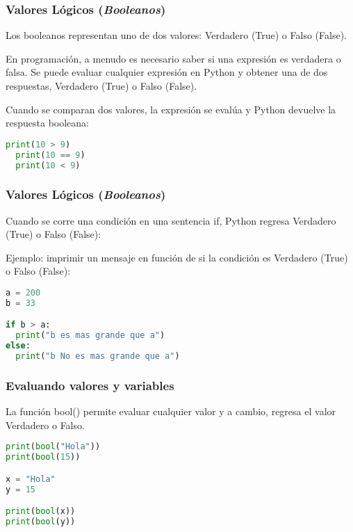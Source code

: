 \begin{frame}[fragile]
  \frametitle{Valores Lógicos (\emph{Booleanos})}
  Los booleanos representan uno de dos valores: Verdadero
  (\textcolor{codeKeyword}{True}) o Falso
  (\textcolor{codeKeyword}{False}).

  \pausa
  \vspace{\baselineskip}
  En programación, a menudo es necesario saber si una expresión es verdadera
  o falsa. Se puede evaluar cualquier expresión en Python y obtener una de
  dos respuestas, Verdadero (\textcolor{codeKeyword}{True})
  o Falso (\textcolor{codeKeyword}{False}).

  \pausa
  \vspace{\baselineskip}
  Cuando se comparan dos valores, la expresión se evalúa y Python
  devuelve la respuesta booleana: 

  \begin{lstlisting}[language=Python]
  print(10 > 9)
  print(10 == 9)
  print(10 < 9)
  \end{lstlisting}
\end{frame}

\begin{frame}[fragile]
  \frametitle{Valores Lógicos (\emph{Booleanos})}

  Cuando se corre una condición en una sentencia
  \textcolor{codeKeyword}{if}, Python regresa Verdadero
  (\textcolor{codeKeyword}{True}) o Falso
  (\textcolor{codeKeyword}{False}):

  \vspace{\baselineskip}
  Ejemplo: imprimir un mensaje en función de si la condición es Verdadero
  (\textcolor{codeKeyword}{True}) o Falso
  (\textcolor{codeKeyword}{False}):
  \begin{lstlisting}[language=Python]
a = 200
b = 33

if b > a:
  print("b es mas grande que a")
else:
  print("b No es mas grande que a") 
  \end{lstlisting}
\end{frame}

\begin{frame}[fragile]
  \frametitle{Evaluando valores y variables}

  La función \textcolor{codeKeyword}{bool}() permite evaluar cualquier
  valor y a cambio, regresa el valor Verdadero o Falso.

  \vspace{\baselineskip}
  \begin{lstlisting}[language=Python]
print(bool("Hola"))
print(bool(15))

x = "Hola"
y = 15

print(bool(x))
print(bool(y))
  \end{lstlisting}
\end{frame}

